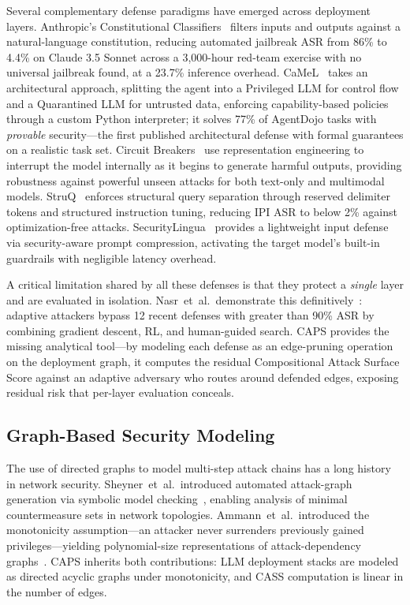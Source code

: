 Several complementary defense paradigms have emerged across deployment layers.
Anthropic's Constitutional Classifiers~\cite{sharma2025constitutional} filters
inputs and outputs against a natural-language constitution, reducing automated
jailbreak ASR from 86\% to 4.4\% on Claude 3.5 Sonnet across a 3,000-hour
red-team exercise with no universal jailbreak found, at a 23.7\% inference
overhead. CaMeL~\cite{debenedetti2025camel} takes an architectural approach,
splitting the agent into a Privileged LLM for control flow and a Quarantined
LLM for untrusted data, enforcing capability-based policies through a custom
Python interpreter; it solves 77\% of AgentDojo tasks with \emph{provable}
security---the first published architectural defense with formal guarantees on
a realistic task set.
Circuit Breakers~\cite{zou2024circuitbreakers} use representation engineering
to interrupt the model internally as it begins to generate harmful outputs,
providing robustness against powerful unseen attacks for both text-only and
multimodal models.
StruQ~\cite{chen2025struq} enforces structural query separation through
reserved delimiter tokens and structured instruction tuning, reducing IPI ASR
to below 2\% against optimization-free attacks.
SecurityLingua~\cite{li2025securitylingua} provides a lightweight input
defense via security-aware prompt compression, activating the target model's
built-in guardrails with negligible latency overhead.

A critical limitation shared by all these defenses is that they protect a
\emph{single} layer and are evaluated in isolation. Nasr~et~al.\ demonstrate
this definitively~\cite{nasr2025adaptive}: adaptive attackers bypass 12 recent
defenses with greater than 90\% ASR by combining gradient descent, RL, and
human-guided search. CAPS provides the missing analytical tool---by modeling
each defense as an edge-pruning operation on the deployment graph, it computes
the residual Compositional Attack Surface Score against an adaptive adversary
who routes around defended edges, exposing residual risk that per-layer
evaluation conceals.


\subsection{Graph-Based Security Modeling}

The use of directed graphs to model multi-step attack chains has a long history
in network security.
Sheyner~et~al.\ introduced automated attack-graph generation via symbolic
model checking~\cite{sheyner2002attackgraphs}, enabling analysis of minimal
countermeasure sets in network topologies.
Ammann~et~al.\ introduced the monotonicity assumption---an attacker never
surrenders previously gained privileges---yielding polynomial-size
representations of attack-dependency graphs~\cite{ammann2002scalable}.
CAPS inherits both contributions: LLM deployment stacks are modeled as
directed acyclic graphs under monotonicity, and CASS computation is linear in
the number of edges.

